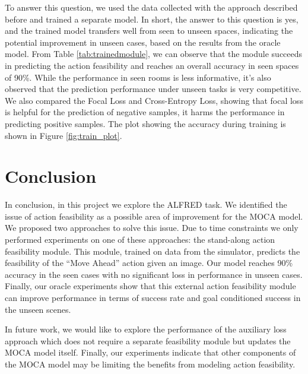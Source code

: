 \documentclass[11pt,a4paper]{article}
\begin{document}
To answer this question, we used the data collected with the approach described before and trained a separate model. In short, the answer to this question is yes, and the trained model transfers well from seen to unseen spaces, indicating the potential improvement in unseen cases, based on the results from the oracle model. From Table \ref{tab:trainedmodule}, we can observe that the module succeeds in predicting the action feasibility and reaches an overall accuracy in seen spaces of 90\%. While the performance in seen rooms is less informative, it's also observed that the prediction performance under unseen tasks is very competitive. We also compared the Focal Loss and Cross-Entropy Loss, showing that focal loss is helpful for the prediction of negative samples, it harms the performance in predicting positive samples. The plot showing the accuracy during training is shown in Figure \ref{fig:train_plot}.

\begin{table}[]
\centering
{}
\caption{Action prediction performance from trained model, in the held-out validation dataset. Here Pos AP and neg AP is the average precision on positive and negative samples respectively. (Feasible action/ Infeasible action )}
\label{tab:trainedmodule}
\end{table}

\section{Conclusion}
In conclusion, in this project we explore the ALFRED task. We identified the issue of action feasibility as a possible area of improvement for the MOCA model. We proposed two approaches to solve this issue. Due to time constraints we only performed experiments on one of these approaches: the stand-along action feasibility module. This module, trained on data from the simulator, predicts the feasibility of the ``Move Ahead'' action given an image. Our model reaches 90\% accuracy in the seen cases with no significant loss in performance in unseen cases. Finally, our oracle experiments show that this external action feasibility module can improve performance in terms of success rate and goal conditioned success in the unseen scenes. 

In future work, we would like to explore the performance of the auxiliary loss approach which does not require a separate feasibility module but updates the MOCA model itself. Finally, our experiments indicate that other components of the MOCA model may be limiting the benefits from modeling action feasibility.


\clearpage



\end{document}
